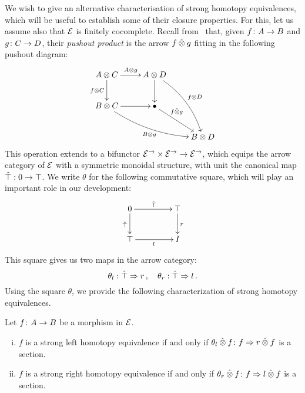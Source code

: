 \documentclass[reqno,10pt,a4paper,oneside]{amsart}
\begin{document}
We wish to give an alternative characterisation of strong homotopy equivalences, which will be useful to establish some of their closure properties. 
For this, let us assume also that $\mathcal{E}$ is finitely cocomplete. Recall from~\cite[Section 4]{riehl-verity:reedy} that, given $f \colon A \to B$ and $g \colon C \to D$, their \emph{pushout product} is the arrow $f \mathbin{\hat{\otimes}} g$ fitting in the following pushout diagram:
\[
\xymatrix{
A \otimes C \ar[r]^{A \otimes g}  \ar[d]_{f \otimes C} & A \otimes D \ar@/^1em/[ddr]^{f \otimes D} \ar[d] & \\ 
B \otimes C \ar@/_1em/[drr]_{B \otimes g} \ar[r] & \bullet \ar[dr]^-(.35){f \hatotimes g}  & \\ 
 & & B \otimes D} 
 \]
This operation extends to a bifunctor  $\mathcal{E}^{\to} \times \mathcal{E}^{\to} \to \mathcal{E}^{\to}$, which equips the arrow category of $\mathcal{E}$ with a symmetric monoidal structure, with unit the canonical map $\hat{\top} : 0 \to \top$. We write $\theta$ for the following commutative square, which will play an important role in  our development:
\begin{equation}
\label{trivial-square}
\begin{gathered}
\xymatrix@C+2em{
  0
  \ar[r]^{\hatunit}
  \ar[d]_{\hatunit}
&
  \unit
  \ar[d]^{\intervalr}
\\
  \unit
  \ar[r]_{\intervall}
&
  \interval
}
\end{gathered}
\end{equation}
This square gives us two maps in the arrow category: 
\[
\theta_{l} : \hat{\top} \Rightarrow r  \, , \quad \theta_{r} : \hat{\top} \Rightarrow l \,. 
\]
Using the square $\theta$, we provide the following  characterization of strong homotopy equivalences.

\begin{lemma}
\label{strong-h-equiv-as-section}
Let $f \colon A \to B$ be a morphism in $\mathcal{E}$.
\begin{enumerate}[(i)]
\item $f$ is a strong left homotopy equivalence if and only if $\theta_{l} \mathbin{\hat{\otimes}} f \colon f \Rightarrow r \mathbin{\hat{\otimes}} f$ is a section.
\item $f$ is a strong right homotopy equivalence if and only if $\theta_{r} \mathbin{\hat{\otimes}} f \colon f \Rightarrow  l \mathbin{\hat{\otimes}} f$ is a section.
\end{enumerate}
\end{lemma}
\end{document}
